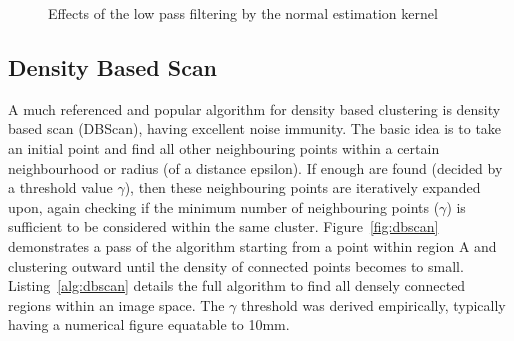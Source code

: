 \documentclass[]{article}
\begin{document}
{\begin{figure}[p]
	\centering     %
	\;

	\caption{Effects of the low pass filtering by the normal estimation kernel}
	\label{fig:spurious_plane_normals}
\end{figure}

\subsection{Density Based Scan} %
\label{sub:density_based_scan}


A much referenced and popular algorithm for density based clustering is density based scan (DBScan), having excellent noise immunity. The basic idea is to take an initial point and find all other neighbouring points within a certain neighbourhood or radius (of a distance epsilon). If enough are found (decided by a threshold value $\gamma$), then these neighbouring points are iteratively expanded upon, again checking if the minimum number of neighbouring points ($\gamma$) is sufficient to be considered within the same cluster. Figure~\ref{fig:dbscan} demonstrates a pass of the algorithm starting from a point within region A and clustering outward until the density of connected points becomes to small. Listing~\ref{alg:dbscan} details the full algorithm to find all densely connected regions within an image space. The $\gamma$ threshold was derived empirically, typically having a numerical figure equatable to 10mm.  


}
\end{document}

